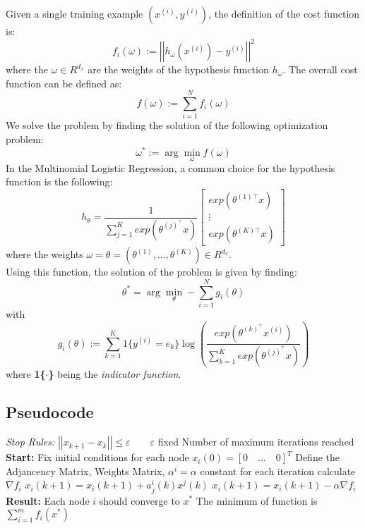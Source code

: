 \documentclass[a4paper,11pt,oneside]{book}
\begin{document}
Given a single training example $(x^{(i)}, y^{(i)})$, the definition of the cost function is:
\begin{equation}
f_i\left(\omega\right):=\left|\left|h_\omega\left(x^{(i)}\right)-y^{(i)}\right|\right|^2
\end{equation}
where the $\omega \in R^{d_{x}}$ are the weights of the hypothesis function $h_{\omega}$. The overall cost function can be defined as:
\begin{equation}
f\left(\omega\right):=\sum_{i=1}^{N}{f_i\left(\omega\right)}
\end{equation}
We solve the problem by finding the solution of the following optimization problem:
\begin{equation}
\omega^*:=\arg\min_\omega f\left(\omega\right)
\end{equation}
In the Multinomial Logistic Regression, a common choice for the hypothesis function is the following:
\begin{equation}
h_\theta=\frac{1}{\sum_{j=1}^{K}{exp\left(\theta^{(j)^\top}x\right)}}\begin{bmatrix}exp\left(\theta^{(1)\top}x\right)  \\ \vdots \\ exp\left(\theta^{(K)\top}x\right) \end{bmatrix}
\end{equation}
where the weights $\omega = \theta = (\theta^{(1)}, ..., \theta^{(K)}) \in R^{d_{x}}$. \\
Using this function, the solution of the problem is given by finding:
\begin{equation}
\theta^*=\arg\min_\theta -\sum_{i=1}^{N}{g_i(\theta)}
\end{equation}
with
\begin{equation}
g_i\left(\theta\right):=\sum_{k=1}^{K}{1\{y^{(i)}=e_k\}\log{\left( \frac{exp(\theta^{(k)^\top}x^{(i)})}{\sum_{k=1}^{K}{exp( \theta^{(j)^\top}x )}} \right)}}
\end{equation}
where \textbf{1\{$\cdot$\}} being the \textit{indicator function}.\cite{CITATION:2}

\subsection {Pseudocode} \label{Subsec1.1.3}
\begin{algorithm}
\caption{}
\begin{algorithmic} [1]
\State \textit{Stop Rules:}
\State $\left|\left|x_{k+1} - x_k\right|\right|  \leq \varepsilon \qquad \varepsilon$ fixed
\State Number of maximum iterations reached
\State \textbf{Start:}
\State Fix initial conditions for each node $x_i(0) = [0 \quad ... \quad 0]^T$
\State Define the Adjancency Matrix, Weights Matrix, $\alpha^i = \alpha$ constant for each iteration
	\State calculate $\nabla f_i$
		\State $x_i(k+1) = x_i(k+1) + a^i_j(k) x^j(k)$
	\EndFor
	\State $x_i(k+1) = x_i(k+1) - \alpha \nabla f_i$
\EndWhile
\State \textbf{Result:}
\State Each node $i$ should converge to $x^*$
\State The minimum of function is $\sum \limits_{i=1}^{m}f_i(x^*)$
\end{algorithmic}
\end{algorithm}
\end{document}
